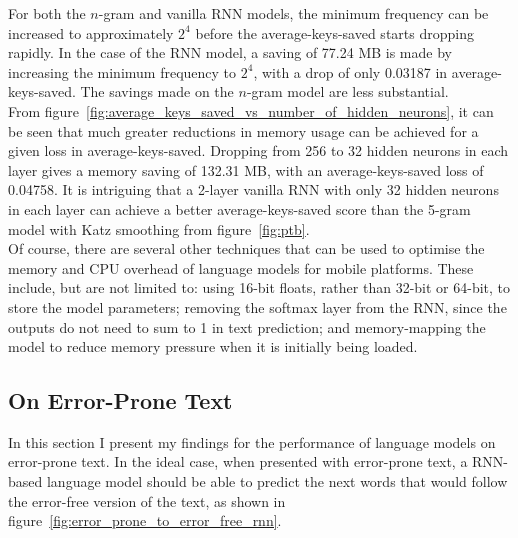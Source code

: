 \documentclass[a4paper, 12pt]{report}
\begin{document}
For both the $n$-gram and vanilla RNN models, the minimum frequency can be increased to approximately $2^4$ before the average-keys-saved starts dropping rapidly. In the case of the RNN model, a saving of 77.24 MB is made by increasing the minimum frequency to $2^4$, with a drop of only 0.03187 in average-keys-saved. The savings made on the $n$-gram model are less substantial. \\

From figure~\ref{fig:average_keys_saved_vs_number_of_hidden_neurons}, it can be seen that much greater reductions in memory usage can be achieved for a given loss in average-keys-saved. Dropping from 256 to 32 hidden neurons in each layer gives a memory saving of 132.31 MB, with an average-keys-saved loss of 0.04758. It is intriguing that a 2-layer vanilla RNN with only 32 hidden neurons in each layer can achieve a better average-keys-saved score than the 5-gram model with Katz smoothing from figure~\ref{fig:ptb}. \\

Of course, there are several other techniques that can be used to optimise the memory and CPU overhead of language models for mobile platforms. These include, but are not limited to: using 16-bit floats, rather than 32-bit or 64-bit, to store the model parameters; removing the softmax layer from the RNN, since the outputs do not need to sum to 1 in text prediction; and memory-mapping the model to reduce memory pressure when it is initially being loaded.

\subsection{On Error-Prone Text} \label{error_prone_evaluation}

In this section I present my findings for the performance of language models on error-prone text. In the ideal case, when presented with error-prone text, a RNN-based language model should be able to predict the next words that would follow the error-free version of the text, as shown in figure~\ref{fig:error_prone_to_error_free_rnn}.
\end{document}
